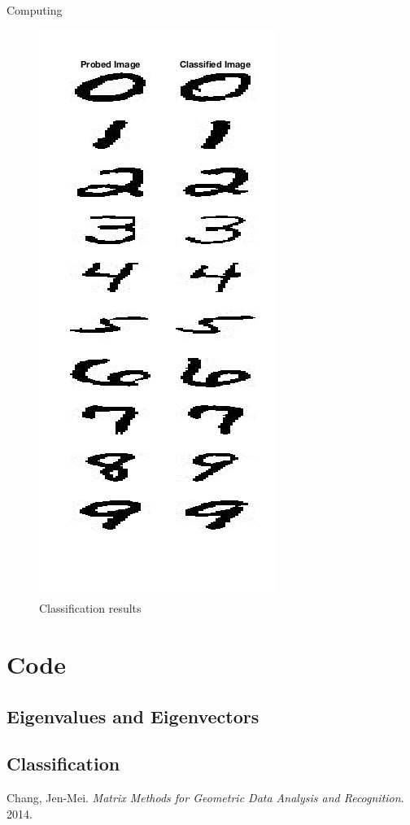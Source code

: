 \begin{section}{Computing}
{\begin{figure}[H]
        \includegraphics[trim={0cm 3cm 0cm 0.5cm},clip,width=0.45\columnwidth]{../data/classify}
        \caption{Classification results}
        \label{fig:classify}
    \end{figure}
}

\end{section}

\newpage

\appendix

\section{Code}

\subsection{Eigenvalues and Eigenvectors}


\subsection{Classification}



\begin{thebibliography}{10}
    Chang, Jen-Mei. \textit{Matrix Methods for Geometric Data Analysis and Recognition}. 2014.

\end{thebibliography}


